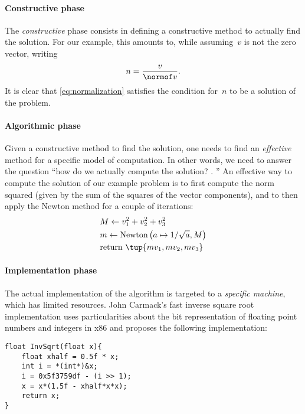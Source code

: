 \paragraph*{Constructive phase}
The \emph{constructive} phase consists in defining a constructive method to actually find the solution.
For our example, this amounts to, while assuming~$v$ is not the zero vector, writing
\begin{equation}
    \label{eq:normalization}
    n=\frac{v}{\normof v}.
\end{equation}
It is clear that \cref{eq:normalization} satisfies the condition for~$n$ to be a solution of the problem.
\paragraph*{Algorithmic phase}
Given a constructive method to find the solution, one needs to find an \emph{effective} method for a specific model of computation.
In other words, we need to answer the question ``how do we actually compute the solution?
.
''
An effective way to compute the solution of our example problem is to first compute the norm squared (given by the sum of the squares of the vector components), and to then apply the Newton method for a couple of iterations:
\begin{equation}
    \label{eq:newton_normalization}
    \begin{aligned}
         & M\leftarrow v_1^2+v_2^2+v_3^2 \\
         & m\leftarrow \text{Newton}\left(a\mapsto 1/\sqrt{a},M\right) \\
         & \text{return }\tup{mv_1,mv_2,mv_3}
    \end{aligned}
\end{equation}
%

\paragraph*{Implementation phase}
The actual implementation of the algorithm is targeted to a \emph{specific machine}, which has limited resources.
John Carmack's fast inverse square root implementation uses particularities about the bit representation of floating point numbers and integers in x86 and proposes the following implementation:

\begin{center}
    \begin{verbatim}
float InvSqrt(float x){
    float xhalf = 0.5f * x;
    int i = *(int*)&x;
    i = 0x5f3759df - (i >> 1);
    x = x*(1.5f - xhalf*x*x);
    return x;
}
    \end{verbatim}
\end{center}

